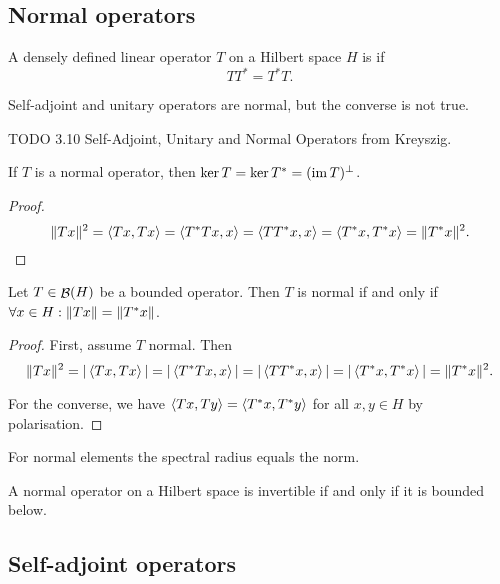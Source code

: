\subsection{Normal operators}
\begin{definition}
A densely defined linear operator $T$ on a Hilbert space $H$ is  if
\[ TT^* = T^*T. \]
\end{definition}
Self-adjoint and unitary operators are normal, but the converse is not true.

TODO 3.10 Self-Adjoint, Unitary and Normal Operators from Kreyszig.

\begin{lemma} \label{equalityKernelAdjointNormal}
If $T$ is a normal operator, then $\ker T = \ker T^* = (\operatorname{im} T)^\perp$.
\end{lemma}
\begin{proof}
\[ \lVert Tx\rVert^2 = \left\langle Tx,Tx \right\rangle = \left\langle T^*Tx, x \right\rangle = \left\langle TT^*x, x \right\rangle = \left\langle T^*x, T^*x \right\rangle = \lVert T^*x\rVert^2. \]
\end{proof}

\begin{proposition}
Let $T\in\mathop{\mathcal{B}}(H)$ be a bounded operator. Then $T$ is normal \textup{if and only if} $\forall x\in H: \lVert Tx\rVert = \lVert T^*x\rVert$.
\end{proposition}
\begin{proof}
First, assume $T$ normal. Then
\[ \lVert Tx\rVert^2 = |\left\langle Tx,Tx \right\rangle| = |\left\langle T^*Tx,x \right\rangle| = |\left\langle TT^*x,x \right\rangle| = |\left\langle T^*x,T^*x \right\rangle| = \lVert T^*x\rVert^2. \]

For the converse, we have $\left\langle Tx, Ty \right\rangle = \left\langle T^*x, T^* y \right\rangle$ for all $x,y\in H$ by polarisation.
\end{proof}

\begin{lemma} \label{normalSpectralRadiusEqualsNorm}
For normal elements the spectral radius equals the norm.
\end{lemma}

\begin{lemma}
A normal operator on a Hilbert space is invertible \textup{if and only if} it is bounded below.
\end{lemma}

\subsection{Self-adjoint operators}
